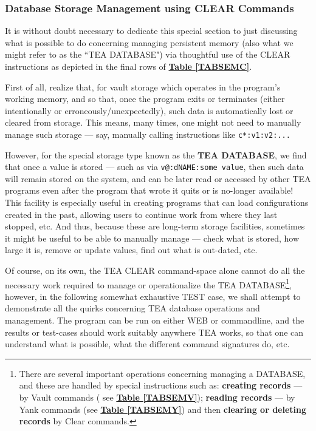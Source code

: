 \documentclass[a4paper, 18pt]{book} %
\begin{document}
\subsubsection{Database Storage Management using CLEAR Commands}

It is without doubt necessary to dedicate this special section to just discussing what is possible to do concerning managing persistent memory (also what we might refer to as the ``TEA DATABASE") via thoughtful use of the CLEAR instructions as depicted in the final rows of \textbf{\hyperref[TABSEMC]{Table \ref{TABSEMC}}}.


\vspace{2em}

First of all, realize that, for vault storage which operates in the program's working memory, and so that, once the program exits or terminates (either intentionally or erroneously/unexpectedly), such data is automatically lost or cleared from storage. This means, many times, one might not need to manually manage such storage --- say, manually calling instructions like \texttt{c*:v1:v2:...}

\vspace{2em}

However, for the special storage type known as the \textbf{TEA DATABASE}, we find that once a value is stored --- such as via \texttt{v@:dNAME:{some value}}, then such data will remain stored on the system, and can be later read or accessed by other TEA programs even after the program that wrote it quits or is no-longer available! This facility is especially useful in creating programs that can load configurations created in the past, allowing users to continue work from where they last stopped, etc. And thus, because these are long-term storage facilities, sometimes it might be useful to be able to manually manage --- check what is stored, how large it is, remove or update values, find out what is out-dated, etc.

\vspace{2em}

Of course, on its own, the TEA CLEAR command-space alone cannot do all the necessary work required to manage or operationalize the TEA DATABASE\footnote{There are several important operations concerning managing a DATABASE, and these are handled by special instructions such as: \textbf{creating records} --- by Vault commands ( see \textbf{\hyperref[TABSEMV]{Table \ref{TABSEMV}}}); \textbf{reading records} --- by Yank commands (see \textbf{\hyperref[TABSEMY]{Table \ref{TABSEMY}}}) and then \textbf{clearing or deleting records} by Clear commands.}, however, in the following somewhat exhaustive TEST case, we shall attempt to demonstrate all the quirks concerning TEA database operations and management. The program can be run on either WEB or commandline, and the results or test-cases should work suitably anywhere TEA works, so that one can understand what is possible, what the different command signatures do, etc.
\end{document}
